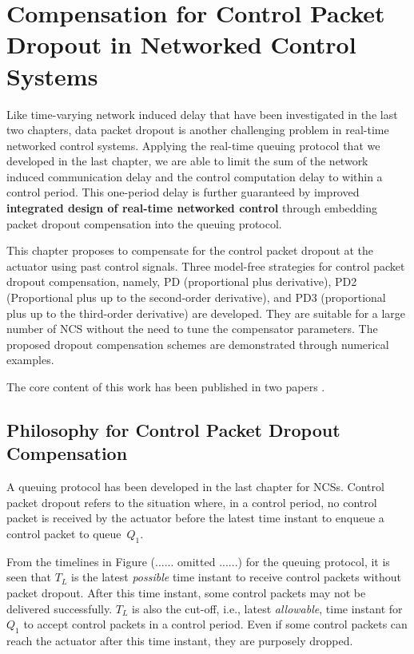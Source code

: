 
\chapter[Compensation for Control Packet Dropout]{Compensation for Control Packet Dropout in Networked Control Systems}
\label{cha:dropout}


Like time-varying network induced delay that have been investigated in the last two chapters, data packet dropout is another challenging problem in real-time networked control systems. Applying the real-time queuing protocol that we developed in the last chapter, we are able to limit the sum of the network induced communication delay and the control computation delay to within a control period. This one-period delay is further guaranteed by improved {\bf integrated design of real-time networked control} through embedding packet dropout compensation into the queuing protocol. 

This chapter proposes to compensate for the control packet dropout at the actuator using past control signals. Three model-free strategies for control packet dropout compensation, namely, PD (proportional plus derivative), PD2 (Proportional plus up to the second-order derivative), and PD3 (proportional plus up to the third-order derivative) are developed. They are suitable for a large number of NCS without the need to tune the compensator parameters. The proposed dropout compensation schemes are demonstrated through numerical examples.  

The core content of this work has been published in two papers \cite{TianINS07,TianIJCM07}.


\section[Philosophy for Packet Dropout Compensation]{Philosophy for Control Packet Dropout Compensation}

A queuing protocol has been developed in the last chapter for NCSs. Control packet dropout refers to the situation where, in a control period, no control packet is received by the actuator before the latest time instant to enqueue a control packet to queue~$Q_1$. 

From the timelines in Figure (...... omitted ......) for the queuing protocol, it is seen that $T_L$ is the latest {\it possible} time instant to receive control packets without packet dropout. After this time instant, some control packets may not be delivered successfully. $T_L$ is also the cut-off, i.e., latest {\em allowable}, time instant for $Q_1$ to accept control packets in a control period. Even if some control packets can reach the actuator after this time instant, they are purposely dropped. 

